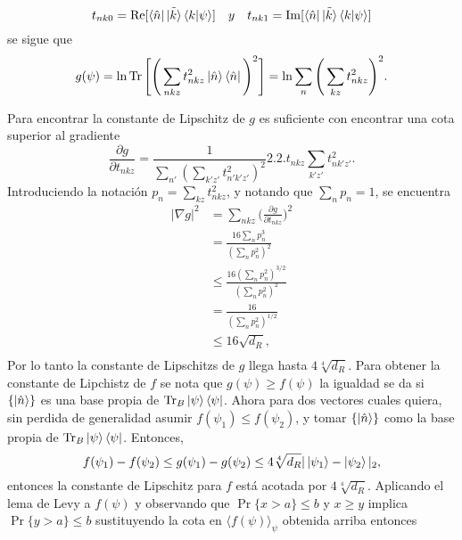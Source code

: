 \begin{enumerate}
\begin{equation}
t_{nk0}= \Re [ \bra{\hat{n}} \tilde{\ket{k}} \bra{k}\ket{\psi}] \quad y \quad  t_{nk1}= \Im [ \bra{\hat{n}} \tilde{\ket{k}} \bra{k}\ket{\psi}]
\end{equation}
se sigue que 
\begin{equation}
g(\psi)= \ln \Tr \Bigg[  \Bigg( \sum_{nkz} t_{nkz}^{2}  \ket{\hat{n}} \bra{\hat{n}}  \Bigg)^{2} \Bigg]= \ln \sum_{n} \Bigg( \sum_{kz} t_{nkz}^{2} \Bigg)^{2}.
\end{equation}

Para encontrar la constante de Lipschitz de $g$ es suficiente con encontrar una cota superior al gradiente 
\begin{equation}
\frac{\partial g}{\partial t_{nkz}}=\frac{1}{\sum_{n'} (\sum_{k'z'}t_{n'k'z'}^{2})^{2}} 2.2.t_{nkz} \sum_{k'z'}t_{nk'z'}^{2}.
\end{equation}
Introduciendo la notación $p_{n}=\sum_{kz}t_{nkz}^{2}$, y notando que $\sum_{n} p_{n}=1$, se encuentra 
\begin{align*}
|\nabla g|^{2} &= \sum_{nkz} \bigg(\frac{\partial g}{\partial t_{nkz}} \bigg )^{2} \\
&= \frac{16 \sum_{n} p_{n}^{3}}{(\sum_{n} p_{n}^{2})^{2}}\\
&\leq \frac{16(\sum_{n} p_{n}^{2})^{3/2}}{(\sum_{n} p_{n}^{2})^{2}}\\
&=\frac{16}{(\sum_{n} p_{n}^{2})^{1/2}}\\
&\leq 16 \sqrt{d_{R}},\\
\end{align*}
Por lo tanto la constante de Lipschitzs de $g$ llega hasta $4 \sqrt[4]{d_{R}}$. Para obtener la constante de Lipchistz de $f$ se nota que $g(\psi) \geq f(\psi)$ la igualdad se da si $ \{ \ket{ \hat{n}} \} $ es una base  propia de $\Tr_{B} \ket{\psi}\bra{\psi}$. Ahora para dos vectores cuales quiera, sin perdida de generalidad asumir $f(\psi_{1}) \leq f(\psi_{2})$, y tomar $ \{ \ket{\hat{n}} \}$ como la base propia de $\Tr_{B} \ket{\psi}\bra{\psi}$. Entonces,
\begin{equation}
f(\psi_{1})- f(\psi_{2})\leq g(\psi_{1})- g(\psi_{2}) \leq 4\sqrt[4]{d_{R}} |\ket{\psi_{1}}-\ket{\psi_{2}}|_{2},
\end{equation}
entonces la constante de Lipschitz para $f$ está acotada por $4\sqrt[4]{d_{R}}$.
Aplicando el lema de Levy a $f(\psi)$ y  observando que $\Pr \{ x>a \} \leq b$ y $x \geq y$ implica $\Pr \{ y>a \} \leq b$  sustituyendo la cota en $\langle f(\psi) \rangle_{\psi}$ obtenida arriba entonces 


\end{enumerate}
